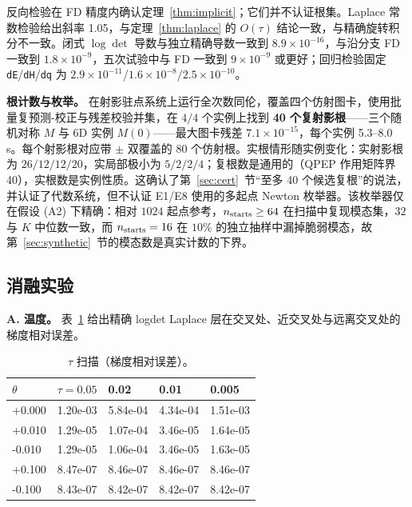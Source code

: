 反向检验在 FD 精度内确认定理~\ref{thm:implicit}；它们并不认证根集。Laplace 常数检验给出斜率 1.05，与定理~\ref{thm:laplace} 的 $O(\tau)$ 结论一致，与精确旋转积分不一致。闭式 $\log\det$ 导数与独立精确导数一致到 $8.9\times10^{-16}$，与沿分支 FD 一致到 $1.8\times10^{-9}$，五次试验中与 FD 一致到 $9\times10^{-9}$ 或更好；回归检验固定 \texttt{dE}/\texttt{dH}/\texttt{dq} 为 $2.9\times10^{-11}$/$1.6\times10^{-8}$/$2.5\times10^{-10}$。

\textbf{根计数与枚举。} 在射影驻点系统上运行全次数同伦，覆盖四个仿射图卡，使用批量复预测-校正与残差校验并集，在 $4/4$ 个实例上找到 \textbf{40 个复射影根}——三个随机对称 $M$ 与 6D 实例 $M(0)$——最大图卡残差 $7.1\times10^{-15}$，每个实例 5.3--8.0 s。每个射影根对应带 $\pm$ 双覆盖的 80 个仿射根。实根情形随实例变化：实射影根为 $26/12/12/20$，实局部极小为 $5/2/2/4$；复根数是通用的（QPEP 作用矩阵界 40），实根数是实例性质。这确认了第~\ref{sec:cert}~节“至多 40 个候选复根”的说法，并认证了代数系统，但不认证 E1/E8 使用的多起点 Newton 枚举器。该枚举器仅在假设 (A2) 下精确：相对 $1024$ 起点参考，$n_{\rm starts}\ge64$ 在扫描中复现模态集，$32$ 与 $K$ 中位数一致，而 $n_{\rm starts}=16$ 在 $10\%$ 的独立抽样中漏掉脆弱模态，故第~\ref{sec:synthetic}~节的模态数是真实计数的下界。\label{sec:enumeration}

\subsection{消融实验}\label{sec:ablations}

\textbf{A. 温度。} 表~\ref{tab:tau} 给出精确 logdet Laplace 层在交叉处、近交叉处与远离交叉处的梯度相对误差。

\begin{table}[t]
\centering
\caption{$\tau$ 扫描（梯度相对误差）。}
\label{tab:tau}
\footnotesize
\setlength{\tabcolsep}{4pt}
\begin{tabular}{@{}l l l l l@{}}
\toprule
$\theta$ & $\tau=0.05$ & 0.02 & 0.01 & 0.005\\
\midrule
+0.000 & 1.20e-03 & 5.84e-04 & 4.34e-04 & 1.51e-03\\
+0.010 & 1.29e-05 & 1.07e-04 & 3.46e-05 & 1.64e-05\\
-0.010 & 1.29e-05 & 1.06e-04 & 3.46e-05 & 1.63e-05\\
+0.100 & 8.47e-07 & 8.46e-07 & 8.46e-07 & 8.46e-07\\
-0.100 & 8.43e-07 & 8.42e-07 & 8.42e-07 & 8.42e-07\\
\bottomrule
\end{tabular}
\end{table}

